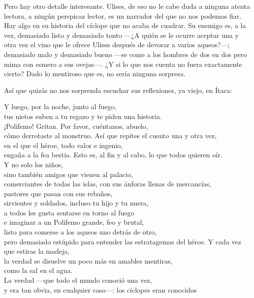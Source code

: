 Pero hay otro detalle interesante. Ulises, de eso no le cabe duda a ninguna atenta lectora, a ningún perspicaz lector, es un narrador del que no nos podemos fiar. Hay algo en su historia del cíclope que no acaba de cuadrar. Su enemigo es, a la vez, demasiado listo y demasiado tonto ---¿A quién se le ocurre aceptar una y otra vez el vino que le ofrece Ulises después de devorar a varios aqueos?---; demasiado malo y demasiado bueno ---se come a los hombres de dos en dos pero mima con esmero a sus ovejas---. ¿Y si lo que nos cuenta no fuera exactamente cierto? Dado lo mentiroso que es, no sería ninguna sorpresa.

Así que quizás no nos sorprenda escuchar sus reflexiones, ya viejo, en Ítaca:

\begin{versopropio}
Y luego, por la noche, junto al fuego,\\
tus nietos suben a tu regazo y te piden una historia.\\
¡Polifemo! Gritan. Por favor, cuéntanos, abuelo,\\
cómo derrotaste al monstruo.
\stanzabreak
Así que repites el cuento una y otra vez,\\
en el que el héroe, todo valor e ingenio,\\
engaña a la fea bestia.
\stanzabreak
Esto es, al fin y al cabo, lo que todos quieren oír.\\
Y no solo los niños,\\
sino también amigos que vienen al palacio,\\
comerciantes de todas las islas, con sus ánforas llenas de mercancías,\\
pastores que pasan con sus rebaños,\\
sirvientes y soldados, incluso tu hijo y tu nuera,\\
a todos les gusta sentarse en torno al fuego\\
e imaginar a un Polifemo grande, feo y brutal,\\
listo para comerse a los aqueos uno detrás de otro,\\
pero demasiado estúpido para entender las estratagemas del héroe.
\stanzabreak
Y cada vez que estiras la madeja,\\
la verdad se disuelve un poco más en amables mentiras,\\
como la sal en el agua.\\
La verdad ---que todo el mundo conoció una vez,\\
y era tan obvia, en cualquier caso---: los cíclopes eran conocidos\\

\end{versopropio}
